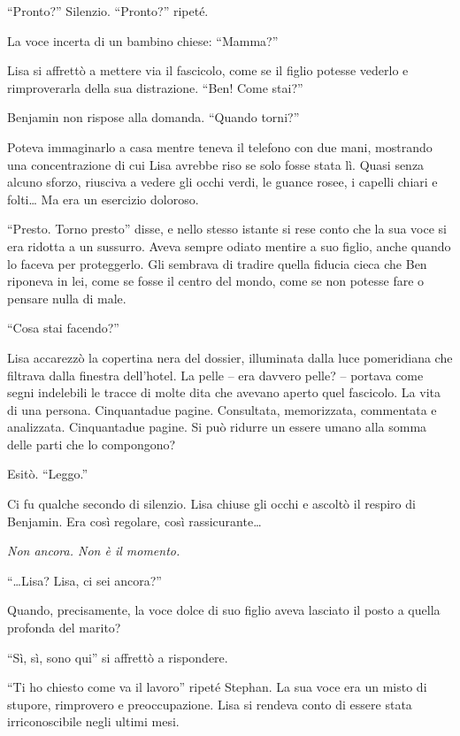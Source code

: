 \documentclass[a4paper,oneside,11pt]{memoir}
\begin{document}
``Pronto?'' Silenzio. ``Pronto?'' ripeté.

La voce incerta di un bambino chiese: ``Mamma?''


Lisa si affrettò a mettere via il fascicolo, come se il figlio potesse vederlo e
rimproverarla della sua distrazione. ``Ben! Come stai?''

Benjamin non rispose alla domanda. ``Quando torni?''

Poteva immaginarlo a casa mentre teneva il telefono con due mani, mostrando una
concentrazione di cui Lisa avrebbe riso se solo fosse stata lì. Quasi senza
alcuno sforzo, riusciva a vedere gli occhi verdi, le guance rosee, i capelli
chiari e folti\dots{} Ma era un esercizio doloroso.

``Presto. Torno presto'' disse, e nello stesso istante si rese conto che la sua
voce si era ridotta a un sussurro. Aveva sempre odiato mentire a suo figlio,
anche quando lo faceva per proteggerlo. Gli sembrava di tradire quella fiducia
cieca che Ben riponeva in lei, come se fosse il centro del mondo, come se non
potesse fare o pensare nulla di male.

``Cosa stai facendo?''

Lisa accarezzò la copertina nera del dossier, illuminata dalla luce pomeridiana
che filtrava dalla finestra dell'hotel. La pelle -- era davvero pelle? --
portava come segni indelebili le tracce di molte dita che avevano aperto quel
fascicolo. La vita di una persona. Cinquantadue pagine. Consultata, memorizzata,
commentata e analizzata. Cinquantadue pagine. Si può ridurre un essere umano
alla somma delle parti che lo compongono?

Esitò. ``Leggo.''

Ci fu qualche secondo di silenzio. Lisa chiuse gli occhi e ascoltò il respiro di
Benjamin. Era così regolare, così rassicurante\dots{}

\emph{Non ancora. Non è il momento.}

``\dots{}Lisa? Lisa, ci sei ancora?''

Quando, precisamente, la voce dolce di suo figlio aveva lasciato il posto a
quella profonda del marito?

``Sì, sì, sono qui'' si affrettò a rispondere.

``Ti ho chiesto come va il lavoro'' ripeté Stephan. La sua voce era un misto di
stupore, rimprovero e preoccupazione. Lisa si rendeva conto di essere stata
irriconoscibile negli ultimi mesi.
\end{document}
